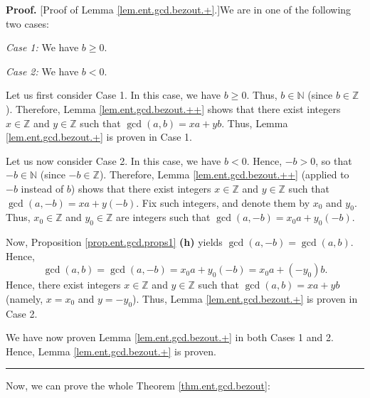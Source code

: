 \documentclass[numbers=enddot,12pt,final,onecolumn,notitlepage]{scrartcl}%
\numberwithin{exer}{subsection}
\theoremstyle{definition}
\newenvironment{proof}[1][Proof]{\noindent\textbf{#1.} }{\ \rule{0.5em}{0.5em}}
\begin{document}
\begin{proof}
[Proof of Lemma \ref{lem.ent.gcd.bezout.+}.]We are in one of the following two cases:

\textit{Case 1:} We have $b\geq0$.

\textit{Case 2:} We have $b<0$.

Let us first consider Case 1. In this case, we have $b\geq0$. Thus,
$b\in\mathbb{N}$ (since $b\in\mathbb{Z}$). Therefore, Lemma
\ref{lem.ent.gcd.bezout.++} shows that there exist integers $x\in\mathbb{Z}$
and $y\in\mathbb{Z}$ such that $\gcd\left(  a,b\right)  =xa+yb$. Thus, Lemma
\ref{lem.ent.gcd.bezout.+} is proven in Case 1.

Let us now consider Case 2. In this case, we have $b<0$. Hence, $-b>0$, so
that $-b\in\mathbb{N}$ (since $-b\in\mathbb{Z}$). Therefore, Lemma
\ref{lem.ent.gcd.bezout.++} (applied to $-b$ instead of $b$) shows that there
exist integers $x\in\mathbb{Z}$ and $y\in\mathbb{Z}$ such that $\gcd\left(
a,-b\right)  =xa+y\left(  -b\right)  $. Fix such integers, and denote them by
$x_{0}$ and $y_{0}$. Thus, $x_{0}\in\mathbb{Z}$ and $y_{0}\in\mathbb{Z}$ are
integers such that $\gcd\left(  a,-b\right)  =x_{0}a+y_{0}\left(  -b\right)  $.

Now, Proposition \ref{prop.ent.gcd.props1} \textbf{(h)} yields $\gcd\left(
a,-b\right)  =\gcd\left(  a,b\right)  $. Hence,%
\[
\gcd\left(  a,b\right)  =\gcd\left(  a,-b\right)  =x_{0}a+y_{0}\left(
-b\right)  =x_{0}a+\left(  -y_{0}\right)  b.
\]
Hence, there exist integers $x\in\mathbb{Z}$ and $y\in\mathbb{Z}$ such that
$\gcd\left(  a,b\right)  =xa+yb$ (namely, $x=x_{0}$ and $y=-y_{0}$). Thus,
Lemma \ref{lem.ent.gcd.bezout.+} is proven in Case 2.

We have now proven Lemma \ref{lem.ent.gcd.bezout.+} in both Cases 1 and 2.
Hence, Lemma \ref{lem.ent.gcd.bezout.+} is proven.
\end{proof}

Now, we can prove the whole Theorem \ref{thm.ent.gcd.bezout}:
\end{document}

